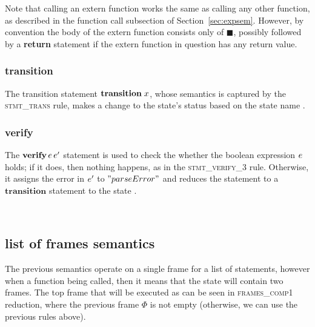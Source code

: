 \documentclass[UTF8]{article}
\begin{document}
Note that calling an extern function works the same as calling any other function, as described in the function call subsection of Section~\ref{sec:expsem}. However, by convention the body of the extern function consists only of $\blacksquare$, possibly followed by a \textbf{return} statement if the extern function in question has any return value.

\begin{figure}[ht!]
    \ottusedrule{\ottdrulestmtXXext{}}
\end{figure}

\subsubsection*{transition}
The transition statement $\mathbf{transition} \; x $, whose semantics is captured by the \textsc{stmt\_trans} rule, makes a change to the state's status \status{} based on the state name \vn{}.

\begin{figure}[ht!]
    \ottusedrule{\ottdrulestmtXXtrans{}} 
\end{figure}



\subsubsection*{verify}
The $\mathbf{verify} \, e \, e'$ statement is used to check the whether the boolean expression $e$ holds; if it does, then nothing happens, as in the \textsc{stmt\_verify\_3} rule. Otherwise, it assigns the error in $e'$ to $"parseError"$ and reduces the statement to a $\mathbf{transition}$ statement to the state \reject{}.
 
\begin{figure}[ht!]
    \ottusedrule{\ottdrulestmtXXverifyXXThree{}} \\
    \ottusedrule{\ottdrulestmtXXverifyXXFour{}} 
\end{figure}



\subsection{list of frames semantics}
The previous semantics operate on a single frame for a list of statements, however when a function being called, then it means that the state will contain two frames. The top frame that will be executed as can be seen in \textsc{frames\_comp1} reduction, where the previous frame $\Phi$ is not empty (otherwise, we can use the previous rules above). 
\end{document}
